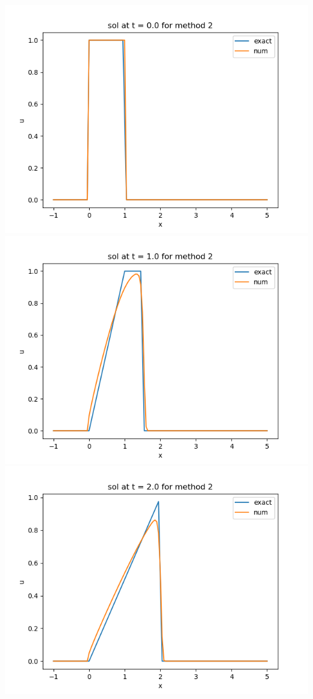 \documentclass{article}
\begin{document}
\begin{center}
	\includegraphics[scale=.23]{hw13 sol t = 0 method 2}
	\includegraphics[scale=.23]{hw13 sol t = 1 method 2}
	\includegraphics[scale=.23]{hw13 sol t = 2 method 2}

\end{center}
\end{document}
